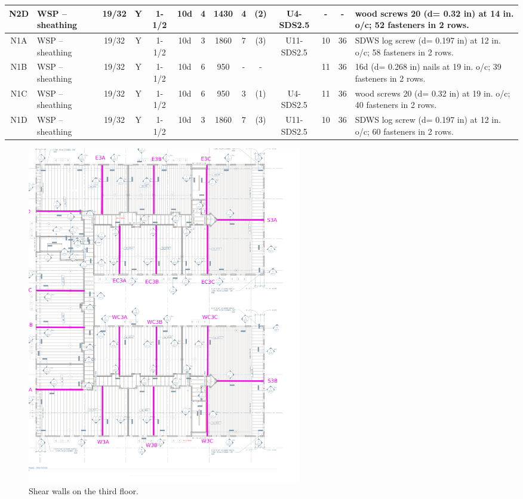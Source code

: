 \begin{center}
\begin{tiny}
\begin{longtable}{|c|p{1.25cm}|c|c|c|c|c|c|c|c|c|c|c|p{2cm}|}
\hline
N2D & WSP – sheathing & 19/32 & Y & 1-1/2 & 10d & 4 & 1430 & 4 & (2) & U4-SDS2.5 & - & - & wood screws 20 (d= 0.32 in) at 14 in. o/c; 52 fasteners in 2 rows.\\
\hline
N1A & WSP – sheathing & 19/32 & Y & 1-1/2 & 10d & 3 & 1860 & 7 & (3) & U11-SDS2.5 & 10 & 36 & SDWS log screw (d= 0.197 in) at 12 in. o/c; 58 fasteners in 2 rows.\\
\hline
N1B & WSP – sheathing & 19/32 & Y & 1-1/2 & 10d & 6 & 950 & - & - &  & 11 & 36 & 16d (d= 0.268 in) nails at 19 in. o/c; 39 fasteners in 2 rows.\\
\hline
N1C & WSP – sheathing & 19/32 & Y & 1-1/2 & 10d & 6 & 950 & 3 & (1) & U4-SDS2.5 & 11 & 36 & wood screws 20 (d= 0.32 in) at 19 in. o/c; 40 fasteners in 2 rows.\\
\hline
N1D & WSP – sheathing & 19/32 & Y & 1-1/2 & 10d & 3 & 1860 & 7 & (3) & U11-SDS2.5 & 10 & 36 & SDWS log screw (d= 0.197 in) at 12 in. o/c; 60 fasteners in 2 rows.\\
\hline
  \end{longtable}
  \end{tiny}
  \end{center}

\begin{figure}
  \begin{center}
  \includegraphics[width=120mm]{figures/walls/3rd_floor_key_plan}
  \end{center}
  \caption{Shear walls on the third floor.}\label{fg_3rd_floor_key_plan}
\end{figure}

